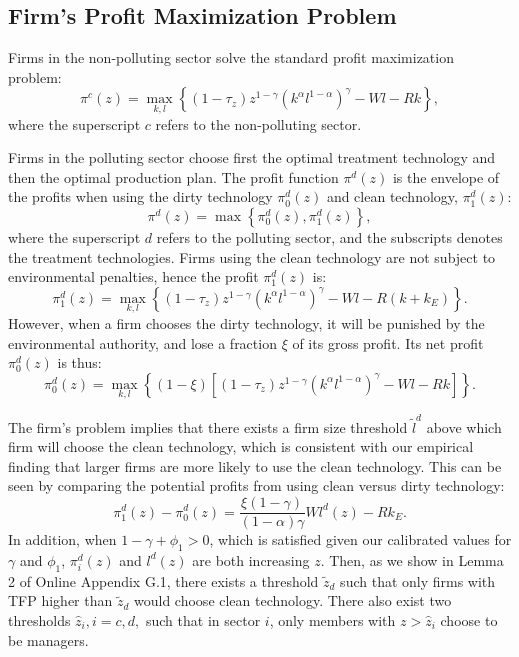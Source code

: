 \documentclass[AEJ]{AEA}
\begin{document}
\subsection{Firm's Profit Maximization Problem}

Firms in the non-polluting sector solve the standard profit maximization problem:
\begin{equation*}
    \pi^c(z) = \max_{k,l} \left\{ (1-\tau_z) z^{1-\gamma}(k^{\alpha}l^{1-\alpha})^{\gamma} - Wl - Rk \right\},
\end{equation*}
where the superscript $c$ refers to the non-polluting sector.

Firms in the polluting sector choose first the optimal treatment technology and then the optimal production plan. The profit function $\pi^d(z)$ is the envelope of the profits when using the dirty technology $\pi_0^d(z)$ and clean technology, $\pi_1^d(z)$:
\begin{equation*}
    \pi^d(z) = \max \left\{ \pi_0^d(z), \pi_1^d(z) \right\},
\end{equation*}
where the superscript $d$ refers to the polluting sector, and the subscripts denotes the treatment technologies. Firms using the clean technology are not subject to environmental penalties, hence the profit $\pi_1^d(z)$ is:
\begin{equation*}
    \pi_1^d(z) = \max_{k,l} \left\{ (1-\tau_z) z^{1-\gamma} (k^{\alpha} l^{1-\alpha})^{\gamma} - Wl - R (k+k_E) \right\}.
\end{equation*}
However, when a firm chooses the dirty technology, it will be punished by the environmental authority, and lose a fraction $\xi$ of its gross profit. Its net profit $\pi_0^d(z)$ is thus:
\begin{equation*}
    \pi_0^d(z) = \max_{k,l} \left\{ \left( 1 - \xi \right)
        \left[ (1-\tau_z) z^{1-\gamma} (k^{\alpha} l^{1-\alpha})^{\gamma} - Wl - Rk \right] \right\}.
\end{equation*}

The firm's problem implies that there exists a firm size threshold $\tilde{l}^d$ above which firm will choose the clean technology, which is consistent with our empirical finding that larger firms are more likely to use the clean technology. This can be seen by comparing the potential profits from using clean versus dirty technology:
\begin{equation*}
    \pi_1^d(z) - \pi_0^d(z)  = \frac{\xi(1-\gamma)}{(1-\alpha)\gamma}Wl^d(z) - Rk_E.
\end{equation*}
In addition, when $1-\gamma+\phi_1 > 0$, which is satisfied given our calibrated values for $\gamma$ and $\phi_1$, $\pi_i^d(z)$ and $l^d(z)$ are both increasing $z$. Then, as we show in Lemma 2 of Online Appendix G.1, there exists a threshold $\tilde{z}_d$ such that only firms with TFP higher than $\tilde{z}_d$ would choose clean technology. %
There also exist two thresholds $\hat{z}_i, i=c,d,$ such that in sector $i$, only members with $z > \hat{z}_i$ choose to be managers.
\end{document}
